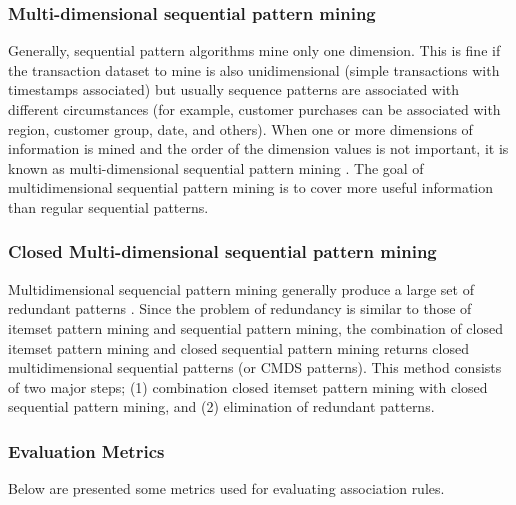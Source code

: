\subsubsection*{Multi-dimensional sequential pattern mining}
Generally, sequential pattern algorithms mine only one dimension. This is fine if the transaction dataset to mine is also unidimensional (simple transactions with timestamps associated) but usually sequence patterns are associated with different circumstances (for example, customer purchases can be associated with region, customer group, date, and others). When one or more dimensions of information is mined and the order of the dimension values is not important, it is known as multi-dimensional sequential pattern mining \cite{pinto2001multi}. The goal of multidimensional sequential pattern mining is to cover more useful information than 
regular sequential patterns.

\subsubsection*{Closed Multi-dimensional sequential pattern mining}
Multidimensional sequencial pattern mining generally produce a large set of redundant patterns \cite{songram2008closed}. Since the problem of redundancy is similar to those of itemset pattern mining and sequential pattern mining, the combination of closed itemset pattern mining and closed sequential pattern mining returns closed multidimensional sequential patterns (or CMDS patterns). This method consists of two major steps; (1) combination closed itemset pattern mining with closed sequential pattern mining, and (2) elimination of redundant patterns.

\subsubsection{Evaluation Metrics}\label{sec:metrics}
Below are presented some metrics used for evaluating association rules.

